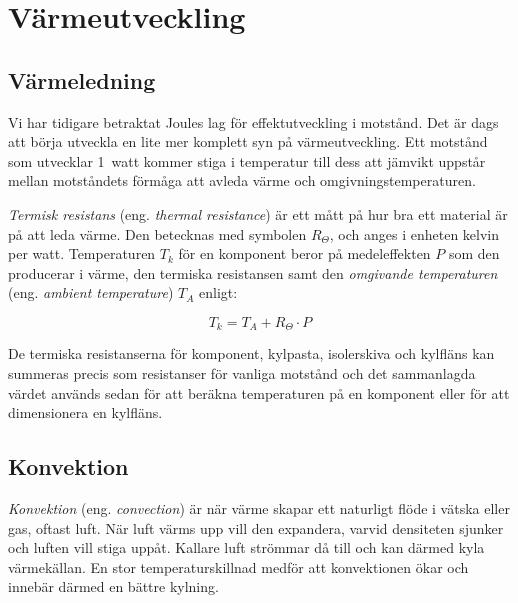 \section{Värmeutveckling}



\subsection{Värmeledning}



Vi har tidigare betraktat Joules lag för effektutveckling i motstånd.
Det är dags att börja utveckla en lite mer komplett syn på värmeutveckling.
Ett motstånd som utvecklar 1~watt kommer stiga i temperatur till dess att
jämvikt uppstår mellan motståndets förmåga att avleda värme och
omgivningstemperaturen.

\emph{Termisk resistans} (eng. \emph{thermal resistance}) är ett mått på
hur bra ett material är på att leda värme. Den betecknas med symbolen \(R_\Theta\),
och anges i enheten kelvin per watt.
Temperaturen \(T_k\) för en komponent beror på medeleffekten \(P\) som den
producerar i värme, den termiska resistansen samt den \emph{omgivande temperaturen}
(eng. \emph{ambient temperature}) \(T_A\) enligt:

\[T_k = T_A + R_\Theta \cdot P\]

De termiska resistanserna för komponent, kylpasta, isolerskiva och kylfläns
kan summeras precis som resistanser för vanliga motstånd och det
sammanlagda värdet används sedan för att beräkna temperaturen på en
komponent eller för att dimensionera en kylfläns.

\subsection{Konvektion}

\emph{Konvektion} (eng. \emph{convection}) är när värme skapar ett
naturligt flöde i vätska eller gas, oftast luft. När luft värms upp 
vill den expandera, varvid densiteten sjunker och luften vill stiga uppåt.
Kallare luft strömmar då till och kan därmed kyla värmekällan. En stor
temperaturskillnad medför att konvektionen ökar och innebär därmed en bättre
kylning.

